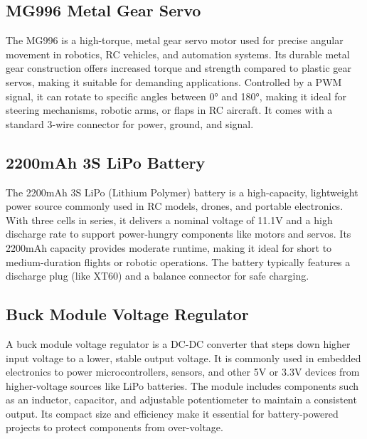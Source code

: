 \subsection{MG996 Metal Gear Servo}
The MG996 is a high-torque, metal gear servo motor used for precise angular movement in robotics, RC vehicles, and automation systems. Its durable metal gear construction offers increased torque and strength compared to plastic gear servos, making it suitable for demanding applications. Controlled by a PWM signal, it can rotate to specific angles between 0° and 180°, making it ideal for steering mechanisms, robotic arms, or flaps in RC aircraft. It comes with a standard 3-wire connector for power, ground, and signal.

\subsection{2200mAh 3S LiPo Battery}
The 2200mAh 3S LiPo (Lithium Polymer) battery is a high-capacity, lightweight power source commonly used in RC models, drones, and portable electronics. With three cells in series, it delivers a nominal voltage of 11.1V and a high discharge rate to support power-hungry components like motors and servos. Its 2200mAh capacity provides moderate runtime, making it ideal for short to medium-duration flights or robotic operations. The battery typically features a discharge plug (like XT60) and a balance connector for safe charging.

\subsection{Buck Module Voltage Regulator}
A buck module voltage regulator is a DC-DC converter that steps down higher input voltage to a lower, stable output voltage. It is commonly used in embedded electronics to power microcontrollers, sensors, and other 5V or 3.3V devices  from higher-voltage sources like LiPo batteries. The module includes components such as an inductor, capacitor, and adjustable potentiometer to maintain a consistent output. Its compact size and efficiency make it essential for battery-powered projects to protect components from over-voltage.

